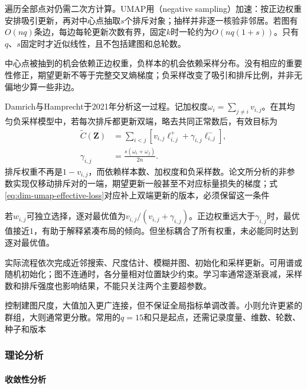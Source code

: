 遍历全部点对仍需二次方计算。UMAP用（negative sampling）加速：按正边权重安排吸引更新，再对中心点抽取$s$个排斥对象；抽样并非逐一核验非邻居。若图有$O(nq)$条边，每边每轮更新次数有界，固定$k$时一轮约为$O(nq(1+s))$。只有$q$、$s$固定时才近似线性，且不包括建图和总轮数。

中心点被抽到的机会依赖正边权重，负样本的机会依赖采样分布。没有相应的重要性修正，期望更新不等于完整交叉熵梯度；负采样改变了吸引和排斥比例，并非无偏地少算一些非边。

Damrich与Hamprecht于2021年分析这一过程。记加权度$\omega_i=\sum_{j\ne i}v_{i,j}$。在其均匀负采样模型中，若每次排斥都更新双端，略去共同正常数后，有效目标为
\begin{equation}
  \label{eq:dim-umap-effective-loss}
  \begin{aligned}
    \widetilde C(\bm{Z})
      &=\sum_{i<j}\left[
        v_{i,j}\ell^+_{i,j}
        +\gamma_{i,j}\ell^-_{i,j}\right],\\
    \gamma_{i,j}&=\frac{s(\omega_i+\omega_j)}{2n}.
  \end{aligned}
\end{equation}
排斥权重不再是$1-v_{i,j}$，而依赖样本数、加权度和负采样数。论文所分析的非参数实现仅移动排斥对的一端，期望更新一般甚至不对应标量损失的梯度；式\eqref{eq:dim-umap-effective-loss}对应补上双端更新的版本，必须保留这一条件

若$w_{i,j}$可独立选择，逐对最优值为$v_{i,j}/(v_{i,j}+\gamma_{i,j})$。正边权重远大于$\gamma_{i,j}$时，最优值接近$1$，有助于解释紧凑布局的倾向。但坐标耦合了所有权重，未必能同时达到逐对最优值。

实际流程依次完成近邻搜索、尺度估计、模糊并图、初始化和采样更新。可用谱或随机初始化；图不连通时，各分量相对位置缺少约束。学习率通常逐渐衰减，采样数和排斥强度也影响结果，不能只关注两个主要超参数。

控制建图尺度，大值加入更广连接，但不保证全局指标单调改善。小则允许更紧的群组，大则通常更分散。常用的$q=15$和只是起点，还需记录度量、维数、轮数、种子和版本

\subsubsection{理论分析}
\label{sec:dim-umap-theory}

\paragraph{收敛性分析}

